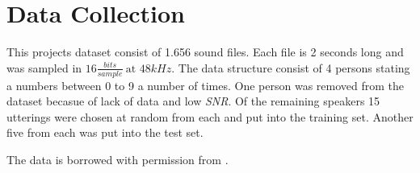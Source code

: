 \section*{Data Collection}

This projects dataset consist of 1.656 sound files. 
Each file is 2 seconds long and was sampled in $16 \frac{bits}{sample} \ \text{at } 48 kHz $.
The data structure consist of 4 persons stating a numbers between 0 to 9 a number of times. 
One person was removed from the dataset becasue of lack of data and low \emph{SNR}.
Of the remaining speakers 15 utterings were chosen at random from each and put into the training set.
Another five from each was put into the test set.

The data is borrowed with permission from \cite{DataSet}. 